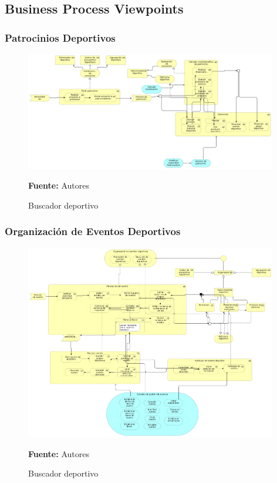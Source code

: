 \subsection{Business Process Viewpoints}

\subsubsection{Patrocinios Deportivos}

\begin{figure}[!htb]
  \begin{center}
    \includegraphics[width=11cm]{./imagenes/business_process/patrociniosdeportivos.png}
    \caption{Buscador deportivo}
    \label{fig:BF_BuscadorDeportivo}
    \textbf{Fuente:}  Autores
  \end{center}
\end{figure}

\subsubsection{Organización de Eventos Deportivos}

\begin{figure}[!htb]
  \begin{center}
    \includegraphics[width=11cm]{./imagenes/business_process/organizacioneventosdeportivos.png}
    \caption{Buscador deportivo}
    \label{fig:BF_BuscadorDeportivo}
    \textbf{Fuente:}  Autores
  \end{center}
\end{figure}

